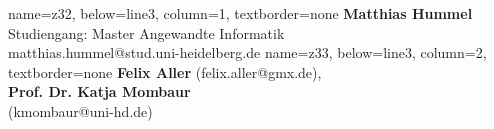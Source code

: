 \documentclass[portrait,a0paper]{baposter}
\begin{document}
\begin{poster}
{ }
  \headerbox{}
    {
    name=z32,
    below=line3,
    column=1,
    textborder=none
    }
    {
    \textsf{\textbf{Matthias Hummel}\\
    	Studiengang: Master Angewandte Informatik\\
	matthias.hummel@stud.uni-heidelberg.de 
	}
 }
    {
    name=z33,
    below=line3,
    column=2,
    textborder=none
    }
    {
    \textsf{\textbf{Felix Aller} (felix.aller@gmx.de),\\
    \textbf{Prof. Dr. Katja Mombaur}\\(kmombaur@uni-hd.de)}
  }


\end{poster}
\end{document}
